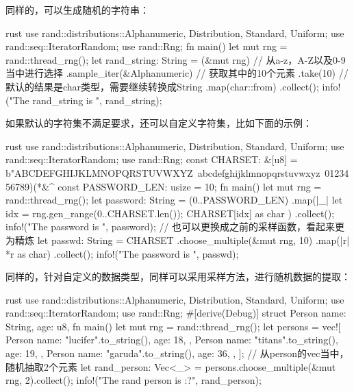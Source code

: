同样的，可以生成随机的字符串：
\begin{code-block}{rust}
use rand::distributions::{Alphanumeric, Distribution, Standard, Uniform};
use rand::seq::IteratorRandom;
use rand::Rng;
fn main() {
    let mut rng = rand::thread_rng();
    let rand_string: String = (&mut rng)
        // 从a-z，A-Z以及0-9当中进行选择
        .sample_iter(&Alphanumeric)
        // 获取其中的10个元素
        .take(10)
        // 默认的结果是char类型，需要继续转换成String
        .map(char::from)
        .collect();
    info!("The rand_string is {}", rand_string);
}
\end{code-block}

如果默认的字符集不满足要求，还可以自定义字符集，比如下面的示例：
\begin{code-block}{rust}
use rand::distributions::{Alphanumeric, Distribution, Standard, Uniform};
use rand::seq::IteratorRandom;
use rand::Rng;
const CHARSET: &[u8] = b"ABCDEFGHIJKLMNOPQRSTUVWXYZ\
    abcdefghijklmnopqrstuvwxyz\
    0123456789)(*&^%
const PASSWORD_LEN: usize = 10;
fn main() {
    let mut rng = rand::thread_rng();
    let password: String = (0..PASSWORD_LEN)
        .map(|_| {
            let idx = rng.gen_range(0..CHARSET.len());
            CHARSET[idx] as char
        })
        .collect();
    info!("The password is {}", password);
    // 也可以更换成之前的采样函数，看起来更为精炼
    let passwd: String = CHARSET
        .choose_multiple(&mut rng, 10)
        .map(|r| *r as char)
        .collect();
    info!("The password is {}", passwd);
}
\end{code-block}

同样的，针对自定义的数据类型，同样可以采用采样方法，进行随机数据的提取：
\begin{code-block}{rust}
use rand::distributions::{Alphanumeric, Distribution, Standard, Uniform};
use rand::seq::IteratorRandom;
use rand::Rng;
#[derive(Debug)]
struct Person {
    name: String,
    age: u8,
}
fn main() {
    let mut rng = rand::thread_rng();
    let persons = vec![
        Person {
            name: "lucifer".to_string(),
            age: 18,
        },
        Person {
            name: "titans".to_string(),
            age: 19,
        },
        Person {
            name: "garuda".to_string(),
            age: 36,
        },
    ];
    // 从person的vec当中，随机抽取2个元素
    let rand_person: Vec<_> = persons.choose_multiple(&mut rng, 2).collect();
    info!("The rand person is {:?}", rand_person);
}
\end{code-block}

